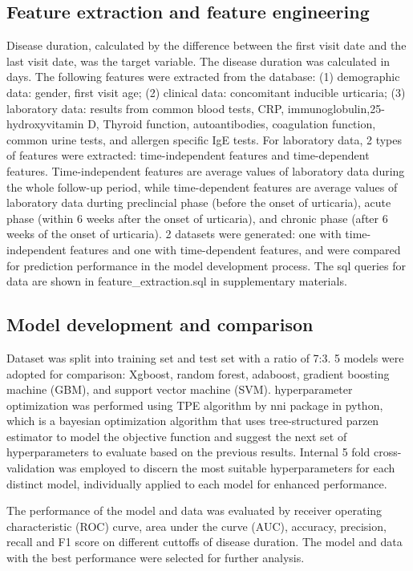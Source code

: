 \documentclass[preprint,12pt,authoryear]{elsarticle}
\begin{document}
\subsection{Feature extraction and feature engineering}\label{FeatureEngineering}
Disease duration, calculated by the difference between the first visit date and the last visit date, was the target variable. The disease duration was calculated in days. The following features were extracted from the database: (1) demographic data: gender, first visit age; (2) clinical data: concomitant inducible urticaria; (3) laboratory data: results from common blood tests, CRP, immunoglobulin,25-hydroxyvitamin D, Thyroid function, autoantibodies, coagulation function, common urine tests, and allergen specific IgE tests. 
For laboratory data, 2 types of features were extracted: time-independent features and time-dependent features. Time-independent features are average values of laboratory data during the whole follow-up period, while time-dependent features are average values of laboratory data durting preclincial phase (before the onset of urticaria), acute phase (within 6 weeks after the onset of urticaria), and chronic phase (after 6 weeks of the onset of urticaria). 2 datasets were generated: one with time-independent features and one with time-dependent features, and were compared for prediction performance in the model development process. The sql queries for data are shown in feature\_extraction.sql in supplementary materials.

\subsection{Model development and comparison}\label{Training}
Dataset was split into training set and test set with a ratio of 7:3. 
5 models were adopted for comparison: Xgboost, random forest, adaboost, gradient boosting machine (GBM), and support vector machine (SVM). hyperparameter optimization was performed using TPE algorithm by nni package in python, which is a bayesian optimization algorithm that uses tree-structured parzen estimator to model the objective function and suggest the next set of hyperparameters to evaluate based on the previous results. Internal 5 fold cross-validation was employed to discern the most suitable hyperparameters for each distinct model, individually applied to each model for enhanced performance.

The performance of the model and data was evaluated by receiver operating characteristic (ROC) curve, area under the curve (AUC), accuracy, precision, recall and F1 score on different cuttoffs of disease duration. The model and data with the best performance were selected for further analysis.
\end{document}
